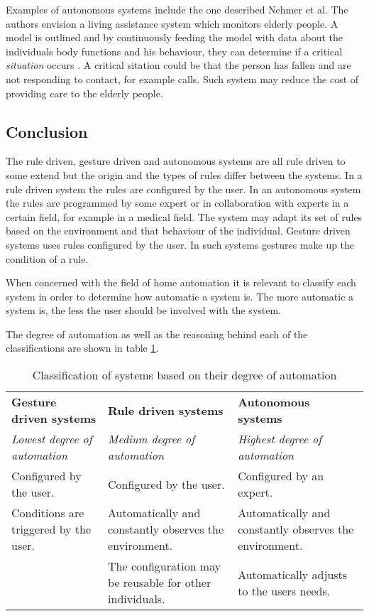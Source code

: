 Examples of autonomous systems include the one described Nehmer et al. The authors envision a living assistance system which monitors elderly people. A model is outlined and by continuously feeding the model with data about the individuals body functions and his behaviour, they can determine if a critical \textit{situation} occurs \cite{nehmer2006living}. A critical sitation could be that the person has fallen and are not responding to contact, for example calls.
Such system may reduce the cost of providing care to the elderly people.


\subsection{Conclusion}

The rule driven, gesture driven and autonomous systems are all rule driven to some extend but the origin and the types of rules differ between the systems. In a rule driven system the rules are configured by the user.
In an autonomous system the rules are programmed by some expert or in collaboration with experts in a certain field, for example in a medical field. The system may adapt its set of rules based on the environment and that behaviour of the individual.
Gesture driven systems uses rules configured by the user. In such systems gestures make up the condition of a rule.

When concerned with the field of home automation it is relevant to classify each system in order to determine how automatic a system is. The more automatic a system is, the less the user should be involved with the system.

The degree of automation as well as the reasoning behind each of the classifications are shown in table \ref{tbl:system-categories}.

\begin{table}[h]
\centering
\caption{Classification of systems based on their degree of automation}
\label{tbl:system-categories}
\begin{tabularx}{\textwidth}{XXX}
\textbf{Gesture driven systems} & \textbf{Rule driven systems} & \textbf{Autonomous systems} \\
\textit{Lowest degree of automation}
&
\textit{Medium degree of automation}
& 
\textit{Highest degree of automation}\\
Configured by the user.
&
Configured by the user.
& 
Configured by an expert.\\
Conditions are triggered by the user.
&
Automatically and constantly observes the environment.
&
Automatically and constantly observes the environment.\\
~
&
The configuration may be reusable for other individuals.
&
Automatically adjusts to the users needs.\\
\end{tabularx}
\end{table}

